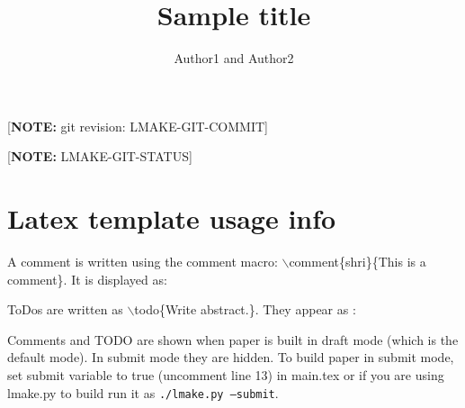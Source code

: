 \documentclass[twocolumn]{article}     %
\newcommand{\comment}[2]{\relax}
\newcommand{\todo}[1]{\relax}
\newcommand{\comment}[2]{\textcolor{commentcolor}{(#2 \emph{--#1})}}
\newcommand{\todo}[1]{\textcolor{commentcolor}{(TODO: #1)}}
\begin{document}
\title{Sample title}  %

\author{Author1 and Author2\\  %
}


\date{}

\maketitle

\ifsubmit
{}

[\textbf{NOTE:} git revision: LMAKE-GIT-COMMIT]

[\textbf{NOTE:} LMAKE-GIT-STATUS]

\fi



\ifsubmit
\else

\section*{Latex template usage info}

A comment is written using the comment macro: $\backslash$comment\{shri\}\{This is a comment\}. It is displayed as:

\comment{shri}{This is a comment}


ToDos are written as $\backslash$todo\{Write abstract.\}. They appear as :

\todo{Write abstract.}

Comments and TODO are shown when paper is built in draft mode (which is the default mode). In submit mode they are hidden. To build paper in submit mode, set submit variable to true (uncomment line 13) in main.tex or if you are using lmake.py to build run it as \texttt{./lmake.py --submit}.
\fi










\end{document}

